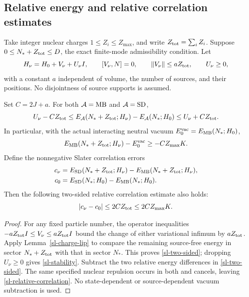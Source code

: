 \subsection{Relative energy and relative correlation estimates}
\label{sl-relative}

Take integer nuclear charges \(1\le Z_i\le Z_{\max}\), and write
\(Z_{\rm tot}=\sum_iZ_i\). Suppose
\(0\le N_*+Z_{\rm tot}\le D\), the exact finite-mode admissibility
condition. Let
\begin{equation}
H_\nu=H_0+V_\nu+U_\nu I,
\qquad [V_\nu,N]=0,
\qquad \|V_\nu\|\le aZ_{\rm tot},
\qquad U_\nu\ge0,
\label{sl-source-assumption}
\end{equation}
with a constant \(a\) independent of volume, the number of sources,
and their positions. No disjointness of source supports is assumed.

\begin{theorem}
\label{sl-relative-theorem}
Set \(C=2J+a\). For both \(\mathcal A={\rm MB}\) and
\(\mathcal A={\rm SD}\),
\begin{equation}
U_\nu-CZ_{\rm tot}
\le E_{\mathcal A}(N_*+Z_{\rm tot};H_\nu)
      -E_{\mathcal A}(N_*;H_0)
\le U_\nu+CZ_{\rm tot}.
\label{sl-two-sided}
\end{equation}
In particular, with the actual interacting neutral vacuum
\(E_0^{\rm vac}=E_{\rm MB}(N_*;H_0)\),
\begin{equation}
E_{\rm MB}(N_*+Z_{\rm tot};H_\nu)-E_0^{\rm vac}
\ge-CZ_{\max}K.
\label{sl-stability}
\end{equation}
Define the nonnegative Slater correlation errors
\begin{align*}
c_\nu&=E_{\rm SD}(N_*+Z_{\rm tot};H_\nu)
       -E_{\rm MB}(N_*+Z_{\rm tot};H_\nu),\\
c_0&=E_{\rm SD}(N_*;H_0)-E_{\rm MB}(N_*;H_0).
\end{align*}
Then the following two-sided relative correlation estimate also holds:
\begin{equation}
|c_\nu-c_0|\le 2CZ_{\rm tot}\le 2CZ_{\max}K.
\label{sl-relative-correlation}
\end{equation}
\end{theorem}

\begin{proof}
For any fixed particle number, the operator inequalities
\(-aZ_{\rm tot}I\le V_\nu\le aZ_{\rm tot}I\) bound the change of
either variational infimum by \(aZ_{\rm tot}\). Apply
Lemma~\ref{sl-charge-lip} to compare the remaining source-free energy
in sector \(N_*+Z_{\rm tot}\) with that in sector \(N_*\). This proves
\eqref{sl-two-sided}; dropping \(U_\nu\ge0\) gives
\eqref{sl-stability}. Subtract the two relative energy differences
in \eqref{sl-two-sided}. The same specified nuclear repulsion occurs
in both and cancels, leaving \eqref{sl-relative-correlation}.
No state-dependent or source-dependent vacuum subtraction is used.
\end{proof}

